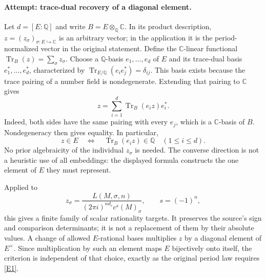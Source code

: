 \documentclass[11pt,a4paper]{article}
\numberwithin{equation}{section}
\newcommand{\Q}{\mathbb{Q}}
\newcommand{\C}{\mathbb{C}}
\newcommand{\eref}[2]{\hyperlink{extra:#1:#2}{[E#2]}}
\begin{document}
\paragraph{Attempt: trace-dual recovery of a diagonal element.}
Let $d=[E:\Q]$ and write $B=E\otimes_{\Q}\C$. In its product description,
$z=(z_\sigma)_{\sigma:E\hookrightarrow\C}$ is an arbitrary vector; in the
application it is the period-normalized vector in the original statement.
Define the $\C$-linear functional
$\operatorname{Tr}_B(z)=\sum_\sigma z_\sigma$.
Choose a $\Q$-basis $e_1,\ldots,e_d$ of $E$ and its trace-dual basis
$e_1^*,\ldots,e_d^*$, characterized by
$\operatorname{Tr}_{E/\Q}(e_i e_j^*)=\delta_{ij}$.
This basis exists because the trace pairing of a number field is
nondegenerate. Extending that pairing to $\C$ gives
\begin{equation}\label{eq71:reconstruct}
 z=\sum_{i=1}^d\operatorname{Tr}_B(e_i z)e_i^*.
\end{equation}
Indeed, both sides have the same pairing with every $e_j$, which is a
$\C$-basis of $B$. Nondegeneracy then gives equality. In particular,
\begin{equation}\label{eq71:criterion}
 z\in E\quad\Longleftrightarrow\quad
 \operatorname{Tr}_B(e_i z)\in\Q\quad(1\leq i\leq d).
\end{equation}
No prior algebraicity of the individual $z_\sigma$ is needed. The converse
direction is not a heuristic use of all embeddings: the displayed formula
constructs the one element of $E$ they must represent.

Applied to
\[
 z_\sigma=\frac{L(M,\sigma,n)}
 {(2\pi i)^{n d_s}c^s(M)_\sigma},\qquad s=(-1)^n,
\]
this gives a finite family of scalar rationality targets. It preserves the
source's sign and comparison determinants; it is not a replacement of them
by their absolute values. A change of allowed $E$-rational bases multiplies
$z$ by a diagonal element of $E^\times$. Since multiplication by such an
element maps $E$ bijectively onto itself, the criterion is independent of
that choice, exactly as the original period law requires \eref{statement}{1}.
\end{document}
